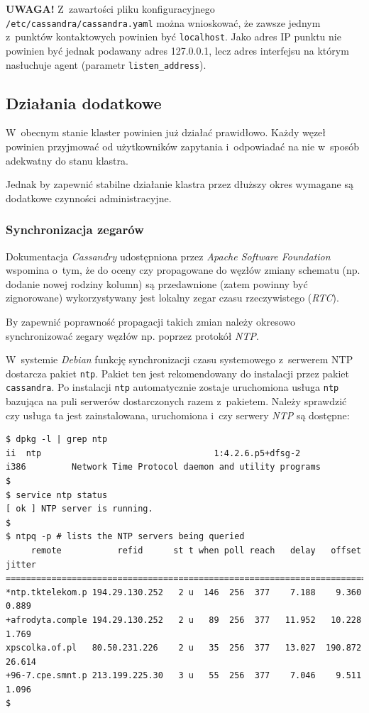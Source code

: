 \documentclass{article} %
\begin{document}
\bigskip

\noindent\textbf{UWAGA!} Z~zawartości pliku konfiguracyjnego \texttt{/etc/cassandra/cassandra.yaml} można wnioskować, że zawsze jednym z~punktów kontaktowych powinien być \texttt{localhost}.
Jako adres IP punktu nie powinien być jednak podawany adres 127.0.0.1, lecz adres interfejsu na którym nasłuchuje agent (parametr \texttt{listen\_address}).

\subsection{Działania dodatkowe}\label{subsec:cluster_misc}

W~obecnym stanie klaster powinien już działać prawidłowo.
Każdy węzeł powinien przyjmować od użytkowników zapytania i~odpowiadać na nie w~sposób adekwatny do stanu klastra.

Jednak by zapewnić stabilne działanie klastra przez dłuższy okres wymagane są dodatkowe czynności administracyjne.

\subsubsection{Synchronizacja zegarów}\label{subsec:cluster_misc_ntp}

Dokumentacja \emph{Cassandry} udostępniona przez \emph{Apache Software Foundation} wspomina o~tym, że do oceny czy propagowane do węzłów zmiany schematu (np. dodanie nowej rodziny kolumn) są przedawnione (zatem powinny być zignorowane) wykorzystywany jest lokalny zegar czasu rzeczywistego (\emph{RTC}).

By zapewnić poprawność propagacji takich zmian należy okresowo synchronizować zegary węzłów np. poprzez protokół \emph{NTP}.

W~systemie \emph{Debian} funkcję synchronizacji czasu systemowego z~serwerem NTP dostarcza pakiet \texttt{ntp}.
Pakiet ten jest rekomendowany do instalacji przez pakiet \texttt{cassandra}.
Po instalacji \texttt{ntp} automatycznie zostaje uruchomiona usługa \texttt{ntp} bazująca na puli serwerów dostarczonych razem z~pakietem.
Należy sprawdzić czy usługa ta jest zainstalowana, uruchomiona i~czy serwery \emph{NTP} są dostępne:

\begin{lstlisting}[style=bash, caption={weryfikacja poprawności działania klienta \emph{NTP}}]
$ dpkg -l | grep ntp
ii  ntp                                  1:4.2.6.p5+dfsg-2             i386         Network Time Protocol daemon and utility programs
$
$ service ntp status
[ ok ] NTP server is running.
$
$ ntpq -p # lists the NTP servers being queried
     remote           refid      st t when poll reach   delay   offset  jitter
==============================================================================
*ntp.tktelekom.p 194.29.130.252   2 u  146  256  377    7.188    9.360   0.889
+afrodyta.comple 194.29.130.252   2 u   89  256  377   11.952   10.228   1.769
xpscolka.of.pl   80.50.231.226    2 u   35  256  377   13.027  190.872  26.614
+96-7.cpe.smnt.p 213.199.225.30   3 u   55  256  377    7.046    9.511   1.096
$
\end{lstlisting}
\end{document}
